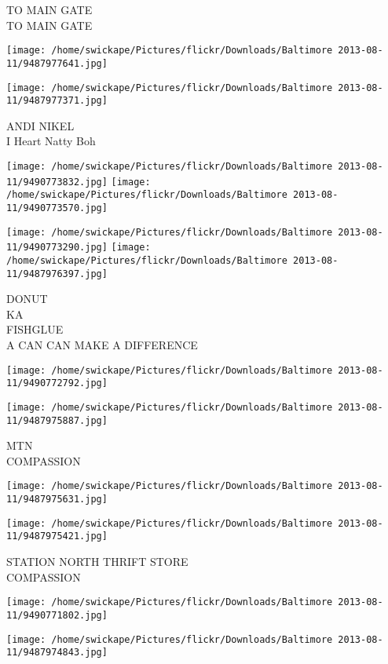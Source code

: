 \documentclass[10pt,letterpaper]{article}
\begin{document}
TO MAIN GATE\\
TO MAIN GATE
\pagebreak

\texttt{[image: /home/swickape/Pictures/flickr/Downloads/Baltimore 2013-08-11/9487977641.jpg]}

\vspace{0.25in}
\texttt{[image: /home/swickape/Pictures/flickr/Downloads/Baltimore 2013-08-11/9487977371.jpg]}

ANDI NIKEL\\
I Heart Natty Boh
\pagebreak

\texttt{[image: /home/swickape/Pictures/flickr/Downloads/Baltimore 2013-08-11/9490773832.jpg]}
\texttt{[image: /home/swickape/Pictures/flickr/Downloads/Baltimore 2013-08-11/9490773570.jpg]}

\texttt{[image: /home/swickape/Pictures/flickr/Downloads/Baltimore 2013-08-11/9490773290.jpg]}
\texttt{[image: /home/swickape/Pictures/flickr/Downloads/Baltimore 2013-08-11/9487976397.jpg]}

DONUT\\
KA\\
FISHGLUE\\
A CAN CAN MAKE A DIFFERENCE
\pagebreak

\texttt{[image: /home/swickape/Pictures/flickr/Downloads/Baltimore 2013-08-11/9490772792.jpg]}

\vspace{0.25in}
\texttt{[image: /home/swickape/Pictures/flickr/Downloads/Baltimore 2013-08-11/9487975887.jpg]}

MTN\\
COMPASSION
\pagebreak

\texttt{[image: /home/swickape/Pictures/flickr/Downloads/Baltimore 2013-08-11/9487975631.jpg]}

\vspace{0.25in}
\texttt{[image: /home/swickape/Pictures/flickr/Downloads/Baltimore 2013-08-11/9487975421.jpg]}

STATION NORTH THRIFT STORE\\
COMPASSION
\pagebreak

\texttt{[image: /home/swickape/Pictures/flickr/Downloads/Baltimore 2013-08-11/9490771802.jpg]}

\vspace{0.25in}
\texttt{[image: /home/swickape/Pictures/flickr/Downloads/Baltimore 2013-08-11/9487974843.jpg]}
\end{document}
